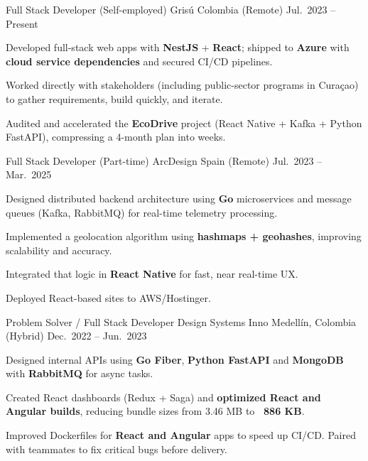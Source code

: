 \begin{cventries}
  \cventry
  {Full Stack Developer (Self-employed)}
  {Grisú}
  {Colombia (Remote)}
  {Jul.\ 2023 -- Present}
  {
    \begin{cvitems}
      \item {Developed full-stack web apps with \textbf{NestJS} + \textbf{React}; shipped to \textbf{Azure} with \textbf{cloud service dependencies} and secured CI/CD pipelines.}
      \item {Worked directly with stakeholders (including public-sector programs in Curaçao) to gather requirements, build quickly, and iterate.}
      \item {Audited and accelerated the \textbf{EcoDrive} project (React Native + Kafka + Python FastAPI), compressing a 4-month plan into weeks.}
    \end{cvitems}
  }

  \cventry
  {Full Stack Developer (Part-time)}
  {ArcDesign}
  {Spain (Remote)}
  {Jul.\ 2023 -- Mar.\ 2025}
  {
    \begin{cvitems}
      \item {Designed distributed backend architecture using \textbf{Go} microservices and message queues (Kafka, RabbitMQ) for real-time telemetry processing.}
      \item {Implemented a geolocation algorithm using \textbf{hashmaps + geohashes}, improving scalability and accuracy.}
      \item {Integrated that logic in \textbf{React Native} for fast, near real-time UX.}
      \item {Deployed React-based sites to AWS/Hostinger.}
    \end{cvitems}
  }

  \cventry
  {Problem Solver / Full Stack Developer}
  {Design Systems Inno}
  {Medellín, Colombia (Hybrid)}
  {Dec.\ 2022 -- Jun.\ 2023}
  {
    \begin{cvitems}
      \item {Designed internal APIs using \textbf{Go Fiber}, \textbf{Python FastAPI} and \textbf{MongoDB} with \textbf{RabbitMQ} for async tasks.}
      \item {Created React dashboards (Redux + Saga) and \textbf{optimized React and Angular builds}, reducing bundle sizes from 3.46 MB to \textbf{~886 KB}.}
      \item {Improved Dockerfiles for \textbf{React and Angular} apps to speed up CI/CD. Paired with teammates to fix critical bugs before delivery.}
    \end{cvitems}
  }


\end{cventries}
